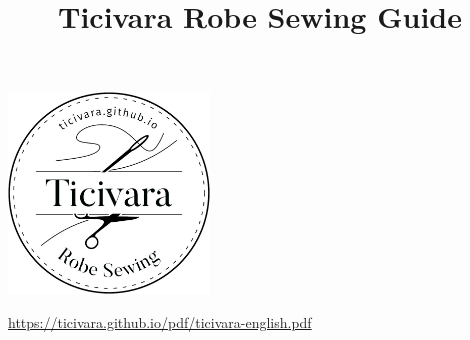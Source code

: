 \documentclass[10pt, twoside, final]{memoir}
\title{Ticivara Robe Sewing Guide}
\begin{document}
\frontmatter

\thispagestyle{empty}
{\centering

  \vspace*{15mm}

  {\chapterTitleFont\fontsize{22}{22}\selectfont\thetitle}

  \vspace*{10mm}

  \includegraphics[width=0.4\textwidth]{./images/logo.jpg}

  \vspace*{10mm}

}


{\centering%
\begin{minipage}{0.7\textwidth}%
  \tableofcontents*%
\end{minipage}%
\par}

\vfill

{%
  \centering\firaSansFont\small\selectfont
  \href{https://ticivara.github.io/pdf/ticivara-english.pdf}{https://ticivara.github.io/pdf/ticivara-english.pdf}%
\par}

\mainmatter










\end{document}
